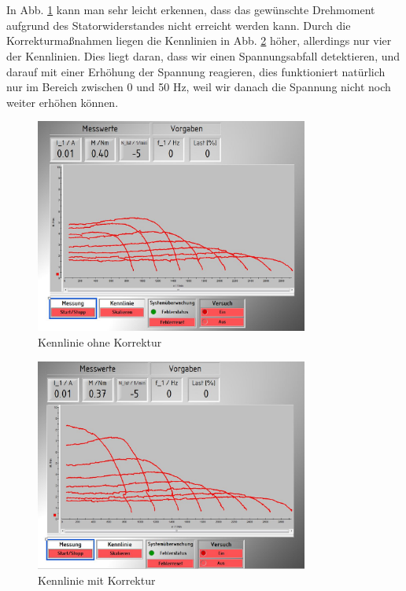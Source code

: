 \section{}\label{sec:aufg7d}
In Abb. \ref{fig:Kennlinie_ohne_Korrektur} kann man sehr leicht erkennen, dass das gewünschte Drehmoment aufgrund des Statorwiderstandes nicht erreicht werden kann. Durch die Korrekturmaßnahmen liegen die Kennlinien in Abb. \ref{fig:Kennlinie_mit_Korrektur} höher, allerdings nur vier der Kennlinien. Dies liegt daran, dass wir einen Spannungsabfall detektieren, und darauf mit einer Erhöhung der Spannung reagieren, dies funktioniert natürlich nur im Bereich zwischen 0 und 50 Hz, weil wir danach die Spannung nicht noch weiter erhöhen können.
\newpage
\begin{figure}[htb]
	\centering
\includegraphics[width=0.8\textwidth]{./Bilder/Messung_Kennlinienfeld_ohne_Korrektur_A7}
\caption{Kennlinie ohne Korrektur}
\label{fig:Kennlinie_ohne_Korrektur}
\end{figure}
\begin{figure}[!htb]
	\centering
\includegraphics[width=0.8\textwidth]{./Bilder/Messung_Kennlinienfeld_mit_Korrektur_A7}
\caption{Kennlinie mit Korrektur}
\label{fig:Kennlinie_mit_Korrektur}
\end{figure}
